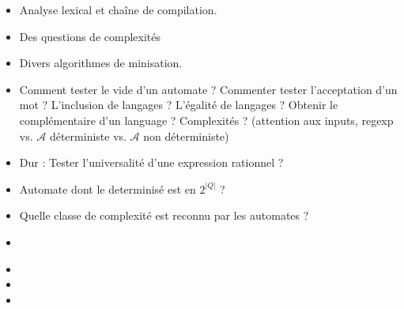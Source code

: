 \documentclass{agregfiche}
\begin{document}
\secidees
\begin{itemize}
\item Analyse lexical et chaîne de compilation.
\item Des questions de complexités
\item Divers algorithmes de minisation.
\end{itemize}


\secquestionsclassiques
\begin{itemize}
\item Comment tester le vide d'un automate ? Commenter tester l'acceptation d'un mot ? L'inclusion de langages ? L'égalité de langages ? Obtenir le complémentaire d'un language ? Complexités ? (attention aux inputs, regexp vs. $\mathcal{A}$ déterministe vs. $\mathcal{A}$ non déterministe)
\item Dur : Tester l'universalité d'une expression rationnel ?
\item Automate dont le determinisé est en $2^|Q|$ ?
\item Quelle classe de complexité est reconnu par les automates ?
\end{itemize}

\secreferences
\begin{itemize}
\item 
\end{itemize}

\secdev
\begin{itemize}
\item 
\item 
\item 

\end{itemize}
\end{document}
